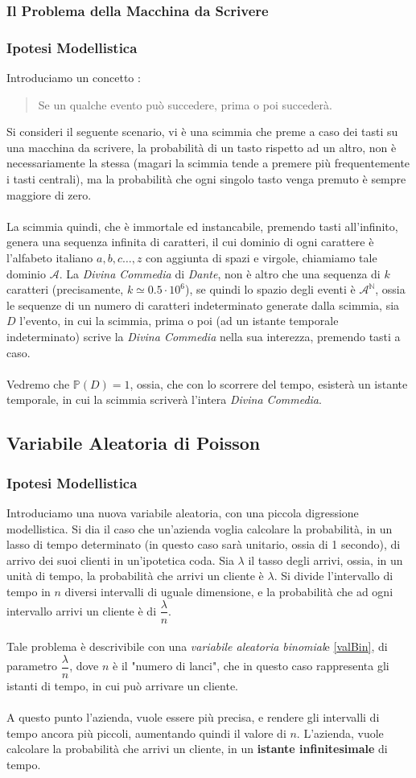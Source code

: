 \documentclass[12pt, letterpaper]{article}
\newcommand{\N}{{\mathbb N}}
\newcommand{\acc}{\\\hphantom{}\\}
\newcommand{\Prob}{{\mathbb P}}
\begin{document}
\subsubsection{Il Problema della Macchina da Scrivere}\subsubsection{Ipotesi Modellistica}
Introduciamo un concetto : \begin{quote}
    Se un qualche evento può succedere, prima o poi succederà.
\end{quote}
Si consideri il seguente scenario, vi è una scimmia che preme a caso dei tasti su una macchina da scrivere, 
la probabilità di un tasto rispetto ad un altro, non è necessariamente la stessa (magari la scimmia tende a premere 
più frequentemente i tasti centrali), ma la probabilità che ogni singolo tasto venga premuto è sempre 
maggiore di zero.\acc La scimmia quindi, che è immortale ed instancabile, premendo tasti all'infinito, genera 
una sequenza infinita di caratteri, il cui dominio di ogni carattere è l'alfabeto italiano \(a,b,c\dots,z\) con aggiunta 
di spazi e virgole, chiamiamo tale dominio \(\mathcal{A}\). La \textit{Divina Commedia} di \textit{Dante}, non è altro che una sequenza di 
\(k\) caratteri (precisamente, \(k\simeq 0.5\cdot10^6\)), se quindi lo spazio degli eventi 
è \(\mathcal{A}^{\N}\), ossia le sequenze di un numero di caratteri indeterminato generate dalla scimmia, sia \(D\) l'evento, in cui la scimmia, prima o poi (ad un istante 
temporale indeterminato) scrive la \textit{Divina Commedia} nella sua interezza, premendo tasti a caso.\acc 
Vedremo che \(\Prob(D)=1\), ossia, che con lo scorrere del tempo, esisterà un istante temporale, in cui 
la scimmia scriverà l'intera \textit{Divina Commedia}.
\subsection{Variabile Aleatoria di Poisson}
\subsubsection{Ipotesi Modellistica}
Introduciamo una nuova variabile aleatoria, con una piccola digressione modellistica. Si dia il caso 
che un'azienda voglia calcolare la probabilità, in un lasso di tempo determinato (in questo caso sarà unitario, ossia di 
1 secondo), di arrivo dei suoi clienti in un'ipotetica coda. Sia \(\lambda\) il tasso degli arrivi, 
ossia, in un unità di tempo, la probabilità che arrivi un cliente è \(\lambda\). Si divide l'intervallo di tempo 
in \(n\) diversi intervalli di uguale dimensione, e la probabilità che ad ogni intervallo 
arrivi un cliente è di \(\dfrac{\lambda}{n}\).\acc  Tale problema è descrivibile con una \textit{variabile 
aleatoria binomial}e \ref{valBin}, di parametro \(\dfrac{\lambda}{n}\), dove \(n\) è il "numero di lanci", che in 
questo caso rappresenta gli istanti di tempo, in cui può arrivare un cliente.\acc 
A questo punto l'azienda, vuole essere più precisa, e rendere gli intervalli di tempo ancora più piccoli, aumentando quindi 
il valore di \(n\). L'azienda, vuole calcolare la probabilità che arrivi un cliente, in un \textbf{istante infinitesimale} 
di tempo. 
\end{document}
